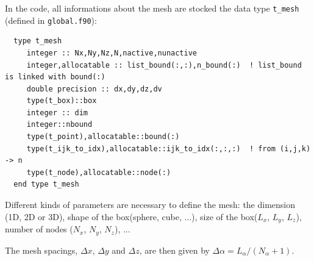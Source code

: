\documentclass[11pt,a4paper]{article}
\begin{document}
In the code, all informations about the mesh are stocked the data type \verb+t_mesh+ (defined in \verb+global.f90+):
\begin{verbatim}
  type t_mesh
     integer :: Nx,Ny,Nz,N,nactive,nunactive
     integer,allocatable :: list_bound(:,:),n_bound(:)  ! list_bound is linked with bound(:) 
     double precision :: dx,dy,dz,dv
     type(t_box)::box
     integer :: dim
     integer::nbound
     type(t_point),allocatable::bound(:)
     type(t_ijk_to_idx),allocatable::ijk_to_idx(:,:,:)  ! from (i,j,k) -> n
     type(t_node),allocatable::node(:)
  end type t_mesh
\end{verbatim}
Different kinds of parameters are necessary to define the mesh: the dimension (1D, 2D or 3D), shape of the box(sphere, cube, ...), size of the box($L_x$, $L_y$, $L_z$), number of nodes ($N_x$, $N_y$, $N_z$), ...

The mesh spacings, $\Delta x$, $\Delta y$ and  $\Delta z$, are then given by $  \Delta\alpha=L_\alpha/(N_\alpha+1)$.
\end{document}
